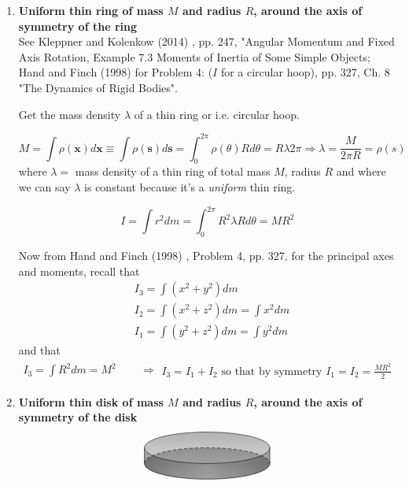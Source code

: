 \begin{enumerate}
\item[(a)] \textbf{Uniform thin ring of mass $M$ and radius $R$, around the axis of symmetry of the ring} \\

See Kleppner and Kolenkow (2014) \cite{dgdt:KlKo2014}, pp. 247, "Angular Momentum and Fixed Axis Rotation, Example 7.3 Moments of Inertia of Some Simple Objects; Hand and Finch (1998) \cite{dgdt:HaFi1998}
 for Problem 4: ($I$ for a circular hoop), pp. 327, Ch. 8 "The Dynamics of Rigid Bodies".

Get the mass density $\lambda$ of a thin ring or i.e. circular hoop.

\[
M = \int \rho(\mathbf{x}) d\mathbf{x} \equiv \int \rho(\mathbf{s}) d\mathbf{s} = \int_0^{2 \pi} \rho (\theta) R d\theta = R \lambda 2\pi \Longrightarrow \boxed{ \lambda  = \frac{M}{ 2\pi R} = \rho(s)}
\] 
where $\lambda =$ mass density of a thin ring of total mass $M$, radius $R$ and where we can say $\lambda$ is constant because it's a \emph{uniform} thin ring.

\begin{equation}
I = \int r^2 dm  = \int_0^{2\pi} R^2 \lambda R d\theta = MR^2
\end{equation}

Now from Hand and Finch (1998) \cite{dgdt:HaFi1998}, Problem 4, pp. 327, for the principal axes and moments, recall that
\[
\begin{aligned}
	& I_3 = \int (x^2 + y^2) dm \\
	& I_2 = \int (x^2 + z^2) dm = \int x^2 dm \\
	& I_1 = \int (y^2 +z^2 ) dm = \int y^2 dm
\end{aligned}
\]
and that
\[
\begin{gathered}
I_3 = \int R^2 dm = M^2 
 \quad \quad \, \Longrightarrow 
\begin{gathered}
I_3 = I_1 + I_2 \text{ so that by symmetry } I_1 = I_2 = \frac{MR^2}{2}
\end{gathered}
\end{gathered}
\]

\item[(b)] \textbf{Uniform thin disk of mass $M$ and radius $R$, around the axis of symmetry of the disk} \\

\[
\begin{tikzpicture}
\fill[top color=gray!50!black,bottom color=gray!10,middle color=gray,shading=axis,opacity=0.25] (0,0) circle (2cm and 0.5cm);
\fill[left color=gray!50!black,right color=gray!50!black,middle color=gray!50,shading=axis,opacity=0.25] (2,0) -- (2,0.5) arc (360:180:2cm and 0.5cm) -- (-2,0) arc (180:360:2cm and 0.5cm);
\fill[top color=gray!90!,bottom color=gray!2,middle color=gray!30,shading=axis,opacity=0.25] (0,0.5) circle (2cm and 0.5cm);
\draw (-2,0.5) -- (-2,0) arc (180:360:2cm and 0.5cm) -- (2,0.5) ++ (-2,0) circle (2cm and 0.5cm);
\draw[densely dashed] (-2,0) arc (180:0:2cm and 0.5cm);
\end{tikzpicture}
\]



\end{enumerate}
